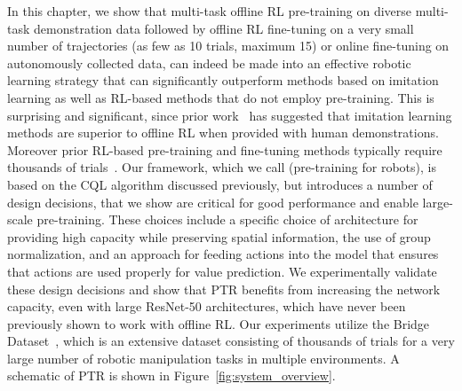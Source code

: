 In this chapter, we show that multi-task offline RL pre-training on diverse multi-task demonstration data followed by offline RL fine-tuning on a very small number of trajectories (as few as 10 trials, maximum 15) or online fine-tuning on autonomously collected data, can indeed be made into an effective robotic learning strategy that can significantly outperform methods based on imitation learning as well as RL-based methods that do not employ pre-training. This is surprising and significant, since prior work~\citep{mandlekar2021what} has suggested that imitation learning methods are superior to offline RL when provided with human demonstrations. Moreover prior RL-based pre-training and fine-tuning methods typically require thousands of trials~\citep{singh2020cog,kalashnikov2021mt,julian2020never,chebotar2021actionable,lee2022spend}. Our framework, which we call \ptrmethodname (pre-training for robots), is based on the CQL algorithm discussed previously, but introduces a number of design decisions, that we show are critical for good performance and enable large-scale pre-training. These choices include a specific choice of architecture for providing high capacity while preserving spatial information, the use of group normalization, and an approach for feeding actions into the model that ensures that actions are used properly for value prediction. We experimentally validate these design decisions and show that PTR benefits from increasing the network capacity, even with large ResNet-50 architectures, which have never been previously shown to work with offline RL. Our experiments utilize the Bridge Dataset~\citep{ebert2021bridge}, which is an extensive dataset consisting of thousands of trials for a very large number of robotic manipulation tasks in multiple environments. A schematic of PTR is shown in Figure~\ref{fig:system_overview}. 

